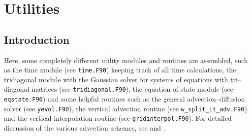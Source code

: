 %
%

\section{Utilities}\label{sec:util}

\subsection{Introduction}

Here, some completely different utility modules and
routines are assembled,
such as the time module (see {\tt time.F90}) keeping track of all 
time calculations,
the tridiagonal module with the Gaussian solver for systems of equations
with tri--diagonal matrices (see {\tt tridiagonal.F90}),
the equation of state module (see {\tt eqstate.F90}) and some 
helpful routines such as the general advection--diffusion solver
(see {\tt yevol.F90}), the vertical advection routine
(see {\tt w\_split\_it\_adv.F90}) and the vertical interpolation routine
(see {\tt gridinterpol.F90}). For detailed discussion of the various
advection schemes, see \cite{Pietrzak98} and \cite{BurchardBolding2002}.
